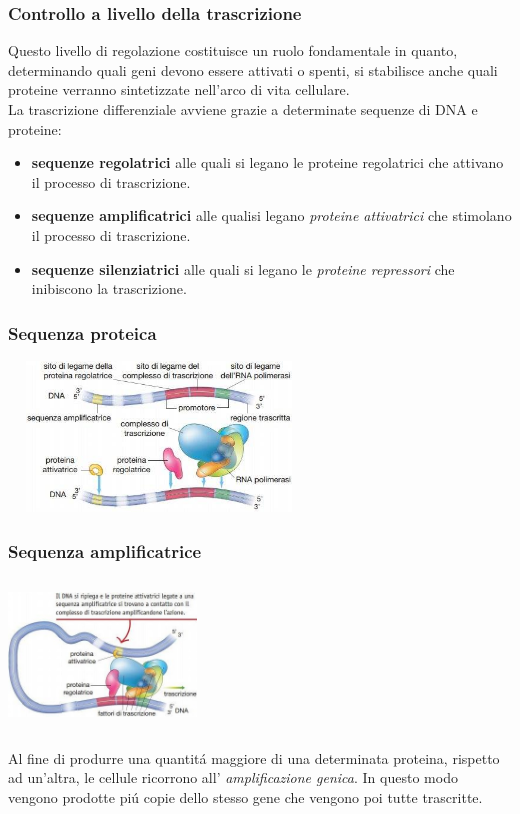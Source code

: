 \documentclass[hyperref={pdfpagelabels=false}]{beamer}
\begin{document}
\begin{frame} \frametitle{Controllo a livello della trascrizione}
Questo livello di regolazione costituisce un ruolo fondamentale in quanto, determinando quali geni devono essere attivati o spenti, si stabilisce anche quali proteine verranno sintetizzate nell'arco di vita cellulare.\\
La trascrizione differenziale avviene grazie a determinate sequenze di DNA e proteine:
\begin{itemize}
\item \textbf{sequenze regolatrici} alle quali si legano le proteine regolatrici che attivano il processo di trascrizione.
\item \textbf{sequenze amplificatrici} alle qualisi legano \emph{proteine attivatrici} che stimolano il processo di trascrizione.
\item \textbf{sequenze silenziatrici} alle quali si legano le \emph{proteine repressori} che inibiscono la trascrizione.
\end{itemize}
\end{frame}


\begin{frame}\frametitle{Sequenza proteica}
\centering \includegraphics[width=8cm,height=4cm]{sequenzeProteine.jpg}
\end{frame}


\begin{frame}\frametitle{Sequenza amplificatrice}
\begin{minipage}[c]{.45\textwidth}
\includegraphics[width=5cm,height=4cm]{proteine.jpg}
\end{minipage}
\begin{minipage}[c]{.5\textwidth}
Al fine di produrre una quantit\'a maggiore di una determinata proteina, rispetto ad un'altra, le cellule ricorrono all' \emph{amplificazione genica}. In questo modo vengono prodotte pi\'u copie dello stesso gene che vengono poi tutte trascritte.
\end{minipage}
\end{frame}
\end{document}
